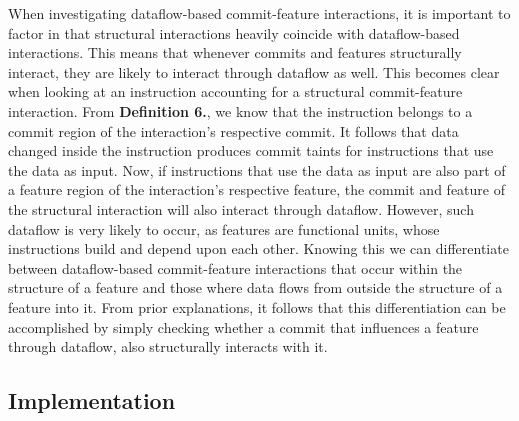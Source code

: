 When investigating dataflow-based commit-feature interactions, it is important to factor in that structural interactions heavily coincide with dataflow-based interactions.
This means that whenever commits and features structurally interact, they are likely to interact through dataflow as well.
This becomes clear when looking at an instruction accounting for a structural commit-feature interaction.
From \textbf{Definition 6.}, we know that the instruction belongs to a commit region of the interaction's respective commit.
It follows that data changed inside the instruction produces commit taints for instructions that use the data as input. 
Now, if instructions that use the data as input are also part of a feature region of the interaction's respective feature, the commit and feature of the structural interaction will also interact through dataflow.
However, such dataflow is very likely to occur, as features are functional units, whose instructions build and depend upon each other. 
Knowing this we can differentiate between dataflow-based commit-feature interactions that occur within the structure of a feature and those where data flows from outside the structure of a feature into it.
From prior explanations, it follows that this differentiation can be accomplished by simply checking whether a commit that influences a feature through dataflow, also structurally interacts with it.

\subsection*{Implementation}\label{ch:implementation}

